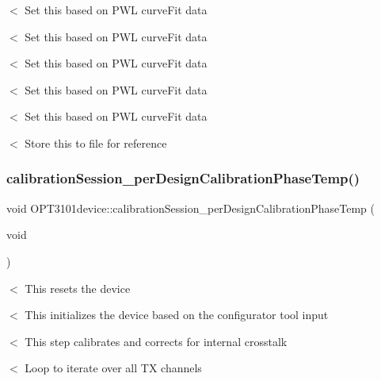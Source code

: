 $<$ Set this based on P\+WL curve\+Fit data

$<$ Set this based on P\+WL curve\+Fit data

$<$ Set this based on P\+WL curve\+Fit data

$<$ Set this based on P\+WL curve\+Fit data

$<$ Set this based on P\+WL curve\+Fit data

$<$ Store this to file for reference \mbox{\label{class_o_p_t3101device_a7b7bc05a1555200f13abda6f08218ad7}} 
\subsubsection{\texorpdfstring{calibration\+Session\+\_\+per\+Design\+Calibration\+Phase\+Temp()}{calibrationSession\_perDesignCalibrationPhaseTemp()}}
{\footnotesize\ttfamily void O\+P\+T3101device\+::calibration\+Session\+\_\+per\+Design\+Calibration\+Phase\+Temp (\begin{DoxyParamCaption}\item[{void}]{ }\end{DoxyParamCaption})}

$<$ This resets the device

$<$ This initializes the device based on the configurator tool input

$<$ This step calibrates and corrects for internal crosstalk

$<$ Loop to iterate over all TX channels

